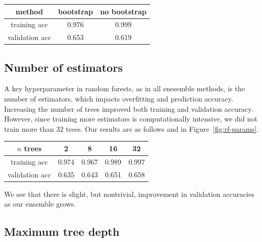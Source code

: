 \documentclass{article}
\begin{document}
\begin{multicols}{2}
%
\begin{center}
    \begin{tabular}{c| c c}
        method & bootstrap & no bootstrap \\\hline
        training acc
        		& 0.976 & 0.999 \\
        validation acc
        		& 0.653 & 0.619
    \end{tabular}
\end{center}

\subsection{Number of estimators}

A key hyperparameter in random forests,
as in all enesemble methods, is the number of estimators,
which impacts overfitting and prediction accuracy.
Increasing the number of trees
improved both training and validation accuracy.
However, since training more estimators
is computationally intensive,
we did not train more than 32 trees.
Our results are as follows and in Figure~\ref{fig:rf-params}.
%
%
%
\begin{center}
    \begin{tabular}{c|c c c c}
        $n$ trees
        		& 2 & 8 & 16 & 32 \\\hline
        training acc
        		& 0.974 & 0.967 & 0.989 & 0.997\\
        validation acc
        		& 0.635 & 0.643 & 0.651 & 0.658
    \end{tabular}
\end{center}

We see that there is slight,
but nontrivial, improvement in validation accuracies
as our ensemble grows.

\subsection{Maximum tree depth}


\end{multicols}
\end{document}
